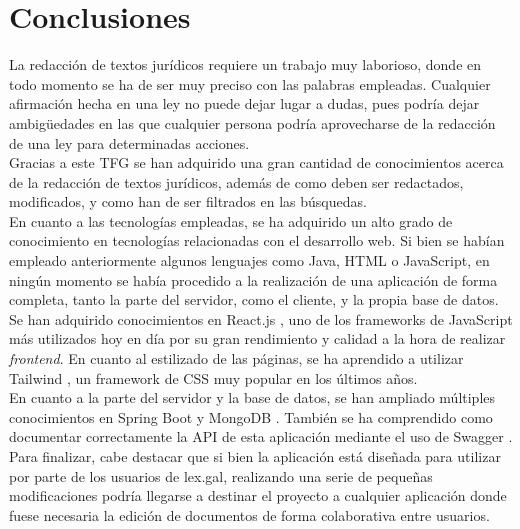 \section{Conclusiones}

La redacción de textos jurídicos requiere un trabajo muy laborioso, donde en todo momento se ha de ser muy preciso con las palabras empleadas. Cualquier afirmación hecha en una ley no puede dejar lugar a dudas, pues podría dejar ambigüedades en las que cualquier persona podría aprovecharse de la redacción de una ley para determinadas acciones.
\\

Gracias a este TFG se han adquirido una gran cantidad de conocimientos acerca de la redacción de textos jurídicos, además de como deben ser redactados, modificados, y como han de ser filtrados en las búsquedas.
\\

En cuanto a las tecnologías empleadas, se ha adquirido un alto grado de conocimiento en tecnologías relacionadas con el desarrollo web. Si bien se habían empleado anteriormente algunos lenguajes como Java, HTML o JavaScript, en ningún momento se había procedido a la realización de una aplicación de forma completa, tanto la parte del servidor, como el cliente, y la propia base de datos.
\\

Se han adquirido conocimientos en React.js \cite{react}, uno de los frameworks de JavaScript más utilizados hoy en día por su gran rendimiento y calidad a la hora de realizar {\it frontend}. En cuanto al estilizado de las páginas, se ha aprendido a utilizar Tailwind \cite{tailwind}, un framework de CSS muy popular en los últimos años.
\\

En cuanto a la parte del servidor y la base de datos, se han ampliado múltiples conocimientos en Spring Boot \cite{spring} y MongoDB \cite{mongodb}. También se ha comprendido como documentar correctamente la API de esta aplicación mediante el uso de Swagger \cite{swagger}.
\\

Para finalizar, cabe destacar que si bien la aplicación está diseñada para utilizar por parte de los usuarios de lex.gal, realizando una serie de pequeñas modificaciones podría llegarse a destinar el proyecto a cualquier aplicación donde fuese necesaria la edición de documentos de forma colaborativa entre usuarios.